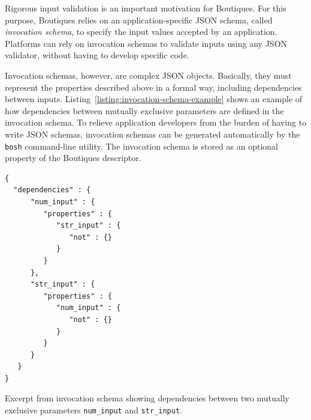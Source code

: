 \documentclass[a4paper,num-refs]{oup-contemporary}
\newcommand{\boutiques}{Boutiques\xspace}
\begin{document}
Rigorous input validation is an important motivation for
\boutiques. For this purpose, \boutiques relies on an
application-specific JSON schema, called \emph{invocation schema}, to
specify the input values accepted by an application. Platforms can
rely on invocation schemas to validate inputs using
any JSON validator, without having to develop specific code.

Invocation schemas, however, are complex JSON objects. Basically, they
must represent the properties described above in a formal way,
including dependencies between
inputs. Listing~\ref{listing:invocation-schema-example} shows an
example of how dependencies between mutually exclusive parameters are
defined in the invocation schema. To relieve application developers
from the burden of having to write JSON schemas, invocation
schemas can be generated automatically by the \texttt{bosh}
command-line utility. The invocation schema is stored as an optional
property of the \boutiques descriptor.


\begin{listing}
\begin{verbatim}
{
  "dependencies" : {
      "num_input" : {
         "properties" : {
            "str_input" : {
               "not" : {}
            }
         }
      },
      "str_input" : {
         "properties" : {
            "num_input" : {
               "not" : {}
            }
         }
      }
   }
}
\end{verbatim}
\caption{Excerpt from invocation schema showing dependencies between
  two mutually exclusive parameters \texttt{num\_input} and
  \texttt{str\_input}.}
\label{listing:invocation-schema-example}
\end{listing}
\end{document}
